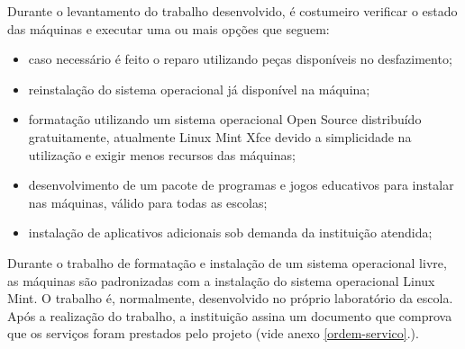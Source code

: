 \documentclass[
	12pt,				%
	openright,			%
	oneside,			%
	a4paper,			%
	english,			%
	spanish,			%
	brazil,				%
	]{abntex2}
\begin{document}
Durante o levantamento do trabalho desenvolvido, é costumeiro verificar o estado das máquinas e executar uma ou mais opções que seguem:

\begin{itemize}

	\item caso necessário é feito o reparo utilizando peças disponíveis no desfazimento;

	\item reinstalação do sistema operacional já disponível na máquina;
	
	\item formatação utilizando um sistema operacional Open Source distribuído gratuitamente, atualmente Linux Mint Xfce devido a simplicidade na utilização e exigir menos recursos das máquinas;
	
	\item desenvolvimento de um pacote de programas e jogos educativos para instalar nas máquinas, válido para todas as escolas;
	
	\item instalação de aplicativos adicionais sob demanda da instituição atendida;

\end{itemize}

Durante o trabalho de formatação e instalação de um sistema operacional livre, as máquinas são padronizadas com a instalação do sistema operacional Linux Mint. O trabalho é, normalmente, desenvolvido no próprio laboratório da escola. Após a realização do trabalho, a instituição assina um documento que comprova que os serviços foram prestados pelo projeto (vide anexo \ref{ordem-servico}.).

\end{document}
